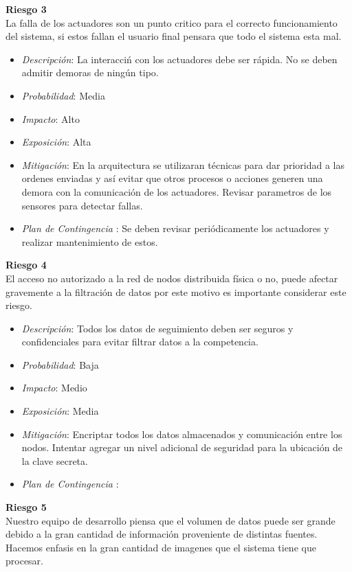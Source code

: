 \textbf{Riesgo 3}\\

La falla de los actuadores son un punto critico para el correcto funcionamiento del sistema, si estos fallan el usuario final pensara que todo el sistema esta mal.\\

\begin{itemize}
 \item \textsl{Descripci\'on}: La interacci\'n con los actuadores debe ser r\'apida. No se deben admitir demoras de ning\'un tipo.
 \item \textsl{Probabilidad}: Media 
 \item \textsl{Impacto}: Alto
 \item \textsl{Exposición}: Alta
 \item \textsl{Mitigación}: En la arquitectura se utilizaran t\'ecnicas para dar prioridad a las ordenes enviadas y as\'i evitar que otros procesos o acciones generen una demora con la comunicaci\'on de los actuadores. Revisar parametros de los sensores para detectar fallas.
 \item \textsl{Plan de Contingencia} : Se deben revisar peri\'odicamente los actuadores y realizar mantenimiento de estos.
\end{itemize}

\textbf{Riesgo 4}\\

El acceso no autorizado a la red de nodos distribuida f\'isica o no, puede afectar gravemente a la filtraci\'on de datos por este motivo es importante considerar este riesgo.\\

\begin{itemize}
 \item \textsl{Descripci\'on}: Todos los datos de seguimiento deben ser seguros y confidenciales para evitar filtrar datos a la competencia.
 \item \textsl{Probabilidad}: Baja
 \item \textsl{Impacto}: Medio
 \item \textsl{Exposición}: Media
 \item \textsl{Mitigación}: Encriptar todos los datos almacenados y comunicaci\'on entre los nodos. Intentar agregar un nivel adicional de seguridad para la ubicaci\'on de la clave secreta.
 \item \textsl{Plan de Contingencia} : 
\end{itemize}

\textbf{Riesgo 5}\\
Nuestro equipo de desarrollo piensa que el volumen de datos puede ser grande debido a la gran cantidad de informaci\'on proveniente de distintas fuentes.\\
Hacemos enfasis en la gran cantidad de imagenes que el sistema tiene que procesar.\\


